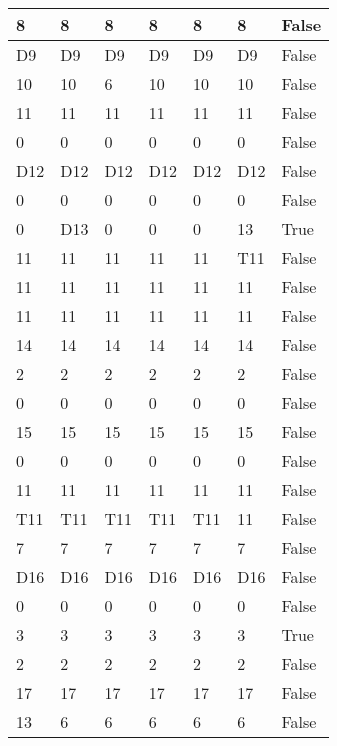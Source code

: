 \begin{longtable}[htbp]{| p{} | p{} | p{}| p{}| p{}| p{}| p{}|}
8 & 8 & 8 & 8 & 8 & 8 & False \\ \hline
\multicolumn{1}{|l|}{D9} & \multicolumn{1}{l|}{D9} & \multicolumn{1}{l|}{D9} & \multicolumn{1}{l|}{D9} & \multicolumn{1}{l|}{D9} & \multicolumn{1}{l|}{D9} & False \\ \hline
10 & 10 & 6 & 10 & 10 & 10 & False \\ \hline
11 & 11 & 11 & 11 & 11 & 11 & False \\ \hline
0 & 0 & 0 & 0 & 0 & 0 & False \\ \hline
\multicolumn{1}{|l|}{D12} & \multicolumn{1}{l|}{D12} & \multicolumn{1}{l|}{D12} & \multicolumn{1}{l|}{D12} & \multicolumn{1}{l|}{D12} & \multicolumn{1}{l|}{D12} & False \\ \hline
0 & 0 & 0 & 0 & 0 & 0 & False \\ \hline
0 & \multicolumn{1}{l|}{D13} & 0 & 0 & 0 & 13 & True \\ \hline
11 & 11 & 11 & 11 & 11 & \multicolumn{1}{l|}{T11} & False \\ \hline
11 & 11 & 11 & 11 & 11 & 11 & False \\ \hline
11 & 11 & 11 & 11 & 11 & 11 & False \\ \hline
14 & 14 & 14 & 14 & 14 & 14 & False \\ \hline
2 & 2 & 2 & 2 & 2 & 2 & False \\ \hline
0 & 0 & 0 & 0 & 0 & 0 & False \\ \hline
15 & 15 & 15 & 15 & 15 & 15 & False \\ \hline
0 & 0 & 0 & 0 & 0 & 0 & False \\ \hline
11 & 11 & 11 & 11 & 11 & 11 & False \\ \hline
\multicolumn{1}{|l|}{T11} & \multicolumn{1}{l|}{T11} & \multicolumn{1}{l|}{T11} & \multicolumn{1}{l|}{T11} & \multicolumn{1}{l|}{T11} & 11 & False \\ \hline
7 & 7 & 7 & 7 & 7 & 7 & False \\ \hline
\multicolumn{1}{|l|}{D16} & \multicolumn{1}{l|}{D16} & \multicolumn{1}{l|}{D16} & \multicolumn{1}{l|}{D16} & \multicolumn{1}{l|}{D16} & \multicolumn{1}{l|}{D16} & False \\ \hline
0 & 0 & 0 & 0 & 0 & 0 & False \\ \hline
3 & 3 & 3 & 3 & 3 & 3 & True \\ \hline
2 & 2 & 2 & 2 & 2 & 2 & False \\ \hline
17 & 17 & 17 & 17 & 17 & 17 & False \\ \hline
13 & 6 & 6 & 6 & 6 & 6 & False \\ \hline

\end{longtable}
